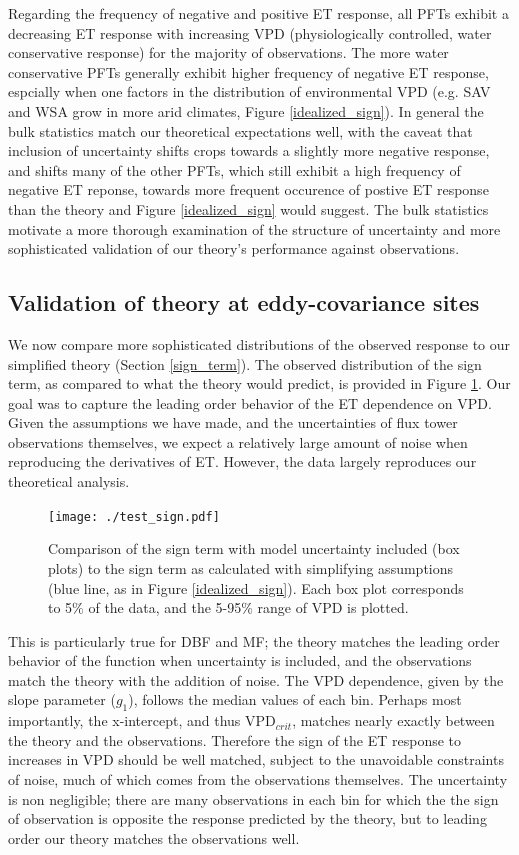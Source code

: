 \documentclass[draft,linenumbers]{agujournal}
\begin{document}
Regarding the frequency of negative and positive ET response, all PFTs
exhibit a decreasing ET response with increasing VPD (physiologically
controlled, water conservative response) for the majority of
observations. The more water conservative PFTs generally exhibit
higher frequency of negative ET response, espcially when one factors
in the distribution of environmental VPD (e.g. SAV and WSA grow in
more arid climates, Figure \ref{idealized_sign}). In general the bulk
statistics match our theoretical expectations well, with the caveat
that inclusion of uncertainty shifts crops towards a slightly more
negative response, and shifts many of the other PFTs, which still
exhibit a high frequency of negative ET reponse, towards more frequent
occurence of postive ET response than the theory and Figure
\ref{idealized_sign} would suggest. The bulk statistics motivate a
more thorough examination of the structure of uncertainty and more
sophisticated validation of our theory's performance against
observations.

\subsection{Validation of theory at eddy-covariance sites}
\label{testing}
We now compare more sophisticated distributions of the observed
response to our simplified theory (Section \ref{sign_term}). The
observed distribution of the sign term, as compared to what the theory
would predict, is provided in Figure \ref{test_sign}. Our goal was to
capture the leading order behavior of the ET dependence on VPD. Given
the assumptions we have made, and the uncertainties of flux tower
observations themselves, we expect a relatively large amount of noise
when reproducing the derivatives of ET. However, the data largely
reproduces our theoretical analysis.

\begin{figure}
  \centering
  \centerline{\texttt{[image: ./test\_sign.pdf]}}
  \caption{Comparison of the sign term with model uncertainty included
    (box plots) to the sign term as calculated with simplifying
    assumptions (blue line, as in Figure \ref{idealized_sign}). Each
    box plot corresponds to 5\% of the data, and the 5-95\% range of
    VPD is plotted.}
  \label{test_sign}
\end{figure}

This is particularly true for DBF and MF; the theory matches the
leading order behavior of the function when uncertainty is included,
and the observations match the theory with the addition of noise. The
VPD dependence, given by the slope parameter ($g_1$), follows the
median values of each bin. Perhaps most importantly, the x-intercept,
and thus VPD$_{crit}$, matches nearly exactly between the theory and
the observations. Therefore the sign of the ET response to increases
in VPD should be well matched, subject to the unavoidable constraints
of noise, much of which comes from the observations themselves. The
uncertainty is non negligible; there are many observations in each bin
for which the the sign of observation is opposite the response
predicted by the theory, but to leading order our theory matches the
observations well.
\end{document}
